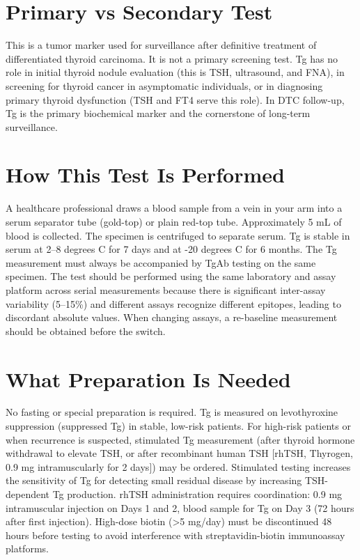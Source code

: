 \section*{Primary vs Secondary Test}
This is a tumor marker used for surveillance after definitive treatment of differentiated thyroid carcinoma. It is not a primary screening test. Tg has no role in initial thyroid nodule evaluation (this is TSH, ultrasound, and FNA), in screening for thyroid cancer in asymptomatic individuals, or in diagnosing primary thyroid dysfunction (TSH and FT4 serve this role). In DTC follow-up, Tg is the primary biochemical marker and the cornerstone of long-term surveillance.

\section*{How This Test Is Performed}
A healthcare professional draws a blood sample from a vein in your arm into a serum separator tube (gold-top) or plain red-top tube. Approximately 5 mL of blood is collected. The specimen is centrifuged to separate serum. Tg is stable in serum at 2--8 degrees C for 7 days and at -20 degrees C for 6 months. The Tg measurement must always be accompanied by TgAb testing on the same specimen. The test should be performed using the same laboratory and assay platform across serial measurements because there is significant inter-assay variability (5--15\%) and different assays recognize different epitopes, leading to discordant absolute values. When changing assays, a re-baseline measurement should be obtained before the switch.

\section*{What Preparation Is Needed}
No fasting or special preparation is required. Tg is measured on levothyroxine suppression (suppressed Tg) in stable, low-risk patients. For high-risk patients or when recurrence is suspected, stimulated Tg measurement (after thyroid hormone withdrawal to elevate TSH, or after recombinant human TSH [rhTSH, Thyrogen, 0.9 mg intramuscularly for 2 days]) may be ordered. Stimulated testing increases the sensitivity of Tg for detecting small residual disease by increasing TSH-dependent Tg production. rhTSH administration requires coordination: 0.9 mg intramuscular injection on Days 1 and 2, blood sample for Tg on Day 3 (72 hours after first injection). High-dose biotin (>5 mg/day) must be discontinued 48 hours before testing to avoid interference with streptavidin-biotin immunoassay platforms.

